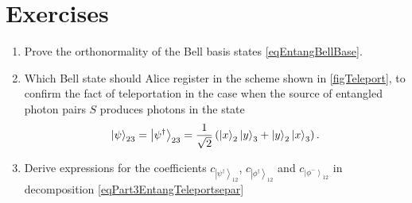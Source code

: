 



\section{Exercises}
\begin{enumerate}
\item Prove the orthonormality of the Bell basis states \eqref{eqEntangBellBase}.
\item Which Bell state should Alice register in the scheme shown in \autoref{figTeleport}, to confirm the fact of teleportation in the case when the source of entangled photon pairs $S$ produces photons in the state
\begin{equation}
  \left|\psi\right>_{23} = \left|\psi^{\dag}\right>_{23} = \frac{1}{\sqrt{2}}\left(
  \ket{x}_2\ket{y}_3 +
  \ket{y}_2\ket{x}_3
  \right).
  \nonumber
\end{equation}
\item Derive expressions for the coefficients 
$c_{\left|\psi^{\dag}\right>_{12}}$, 
$c_{\left|\phi^{\dag}\right>_{12}}$ and 
$c_{\left|\phi^{-}\right>_{12}}$
in decomposition \eqref{eqPart3EntangTeleportsepar}
\end{enumerate}